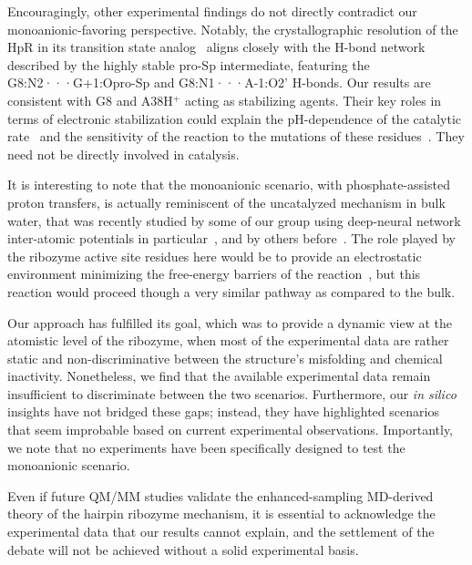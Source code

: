 \documentclass[journal=jacsat,manuscript=article]{achemso}
\begin{document}
Encouragingly, other experimental findings do not directly contradict our monoanionic-favoring perspective.
Notably, the crystallographic resolution of the HpR in its transition state analog~\cite{torelli_comparison_2007}
aligns closely with the H-bond network described by the highly stable pro-Sp intermediate,
featuring the G8:N2···G+1:Opro-Sp and G8:N1···A-1:O2' H-bonds.
Our results are consistent with G8 and A38H$^+$ acting as stabilizing agents.
Their key roles in terms of electronic stabilization 
could explain the pH-dependence of the catalytic rate~\cite{lebruska_rescue_2002, bevilacqua_mechanistic_2003, kuzmin_role_2004, nahas_observation_2004, wilson_nucleobase_2006, wilson_hairpin_2011} 
and the sensitivity of the reaction to the mutations of these residues~\cite{mlynsky_extensive_2010, mlynsky_reactive_2015}. 
They need not be directly involved in catalysis.

It is interesting to note that the monoanionic scenario, 
with phosphate-assisted proton transfers, 
is actually reminiscent of the uncatalyzed mechanism in bulk water, 
that was recently studied by some of our group using deep-neural network inter-atomic potentials in particular~\cite{benayad_molecular_2022,benayad_molecular_2023}, 
and by others before~\cite{florian_phosphate_1998,duarte_resolving_2015}. 
The role played by the ribozyme active site residues here would be to 
provide an electrostatic environment minimizing the free-energy barriers of the reaction~\cite{warshel_electrostatic_2006}, 
but this reaction would proceed though a very similar pathway as compared to the bulk.

Our approach has fulfilled its goal, which was to provide a dynamic view at the atomistic level of the ribozyme,
when most of the experimental data are rather static and non-discriminative 
between the structure's misfolding and chemical inactivity.
Nonetheless, we find that the available experimental data remain insufficient to discriminate between the two scenarios.
Furthermore, our \textit{in silico} insights have not bridged these gaps;
instead, they have highlighted scenarios that seem improbable based on current experimental observations.
Importantly, we note that no experiments have been specifically designed to test the monoanionic scenario.

Even if future QM/MM studies validate the enhanced-sampling MD-derived theory of the hairpin ribozyme mechanism,
it is essential to acknowledge the experimental data that our results cannot explain, 
and the settlement of the debate will not be achieved without a solid experimental basis.
\end{document}
